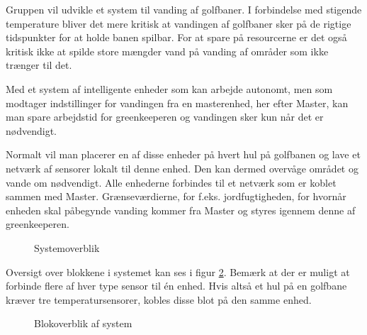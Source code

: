 Gruppen vil udvikle et system til vanding af golfbaner. I forbindelse med stigende temperature bliver det mere kritisk at vandingen af golfbaner sker på de rigtige tidspunkter for at holde banen spilbar. For at spare på resourcerne er det også kritisk ikke at spilde store mængder vand på vanding af områder som ikke trænger til det.

Med et system af intelligente enheder som kan arbejde autonomt, men som modtager indstillinger for vandingen fra en masterenhed, her efter Master, kan man spare arbejdstid for greenkeeperen og vandingen sker kun når det er nødvendigt.

Normalt vil man placerer en af disse enheder på hvert hul på golfbanen og lave et netværk af sensorer lokalt til denne enhed. Den kan dermed overvåge området og vande om nødvendigt. Alle enhederne forbindes til et netværk som er koblet sammen med Master. Grænseværdierne, for f.eks. jordfugtigheden, for hvornår enheden skal påbegynde vanding kommer fra Master og styres igennem denne af greenkeeperen. 

\begin{figure}[ht] \centering
{}
\caption{Systemoverblik}
\label{fig:systemoverblik}
\end{figure}

Oversigt over blokkene i systemet kan ses i figur \ref{fig:bloksystemoverblik}.
Bemærk at der er muligt at forbinde flere af hver type sensor til én enhed. Hvis altså et hul på en golfbane kræver tre temperatursensorer, kobles disse blot på den samme enhed.

\begin{figure}[ht] \centering
{}
\caption{Blokoverblik af system}
\label{fig:bloksystemoverblik}
\end{figure}

